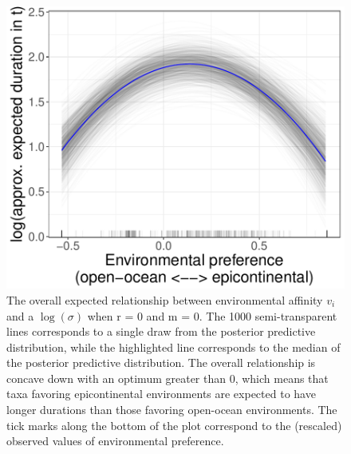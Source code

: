 \documentclass{article}
\begin{document}
\begin{figure}[ht]
  \centering
  \includegraphics[height = 0.5\textheight,width=\textwidth,keepaspectratio=true]{figure/env_effect_1}
  \caption{The overall expected relationship between environmental affinity \(v_{i}\) and a \(\log(\sigma)\) when r = 0 and m = 0. The 1000 semi-transparent lines corresponds to a single draw from the posterior predictive distribution, while the highlighted line corresponds to the median of the posterior predictive distribution. The overall relationship is concave down with an optimum greater than 0, which means that taxa favoring epicontinental environments are expected to have longer durations than those favoring open-ocean environments. The tick marks along the bottom of the plot correspond to the (rescaled) observed values of environmental preference.}
  \label{fig:env_mean_low}
\end{figure}
\end{document}
